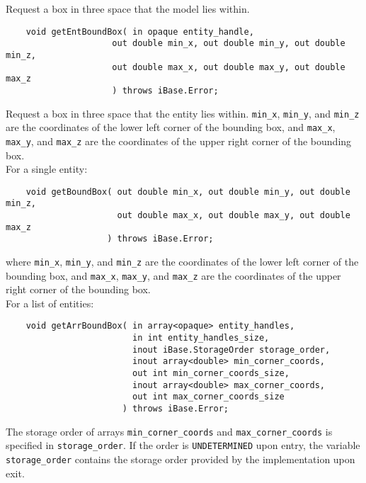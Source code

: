 \documentclass{article}
\begin{document}
Request a box in three space that the model lies within.

\begin{verbatim}
    void getEntBoundBox( in opaque entity_handle,
                     out double min_x, out double min_y, out double min_z,
                     out double max_x, out double max_y, out double max_z
                     ) throws iBase.Error;
\end{verbatim}
Request a box in three space that the entity lies within. {\tt min\_x},
{\tt min\_y}, and {\tt min\_z} are the coordinates of the 
lower left corner of the bounding box, and {\tt max\_x}, {\tt max\_y},
and {\tt max\_z} are
the coordinates of the upper right corner of the bounding box.\\

\hspace{-16pt}For a single entity:

\begin{verbatim}
    void getBoundBox( out double min_x, out double min_y, out double min_z,
                      out double max_x, out double max_y, out double max_z
                    ) throws iBase.Error;
\end{verbatim}
where {\tt min\_x}, {\tt min\_y}, and {\tt min\_z} are the coordinates of the 
lower left corner of the bounding box, and {\tt max\_x}, {\tt max\_y},
and {\tt max\_z} are
the coordinates of the upper right corner of the bounding box.\\

\hspace{-16pt}For a list of entities:

\begin{verbatim}
    void getArrBoundBox( in array<opaque> entity_handles, 
                         in int entity_handles_size,
                         inout iBase.StorageOrder storage_order,
                         inout array<double> min_corner_coords, 
                         out int min_corner_coords_size,
                         inout array<double> max_corner_coords, 
                         out int max_corner_coords_size
                       ) throws iBase.Error;
\end{verbatim}
The storage order of arrays {\tt min\_corner\_coords} and {\tt max\_corner\_coords} is specified in
{\tt storage\_order}. If the order is {\tt UNDETERMINED} upon entry, the variable
{\tt storage\_order} contains the storage order provided by the implementation upon
exit.
                          
\end{document}

